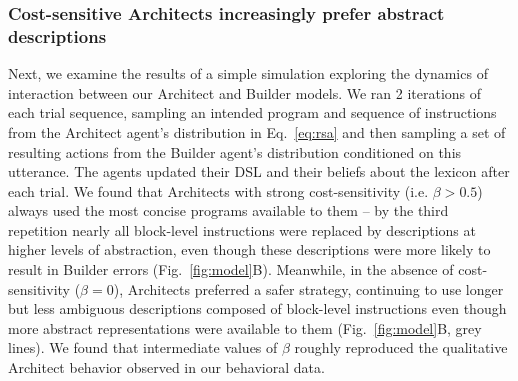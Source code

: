 \documentclass[10pt,letterpaper]{article}
\begin{document}
\vspace{1mm}
\subsubsection{Cost-sensitive Architects increasingly prefer abstract descriptions}
Next, we examine the results of a simple simulation exploring the dynamics of interaction between our Architect and Builder models.
We ran 2 iterations of each trial sequence, sampling an intended program and sequence of instructions from the Architect agent's distribution in Eq.~\ref{eq:rsa} and then sampling a set of resulting actions from the Builder agent's distribution conditioned on this utterance.
The agents updated their DSL and their beliefs about the lexicon after each trial. 
We found that Architects with strong cost-sensitivity (i.e. $\beta>0.5$) always used the most concise programs available to them -- by the third repetition nearly all block-level instructions were replaced by descriptions at higher levels of abstraction, even though these descriptions were more likely to result in Builder errors (Fig.~\ref{fig:model}B).
Meanwhile, in the absence of cost-sensitivity ($\beta=0$), Architects preferred a safer strategy, continuing to use longer but less ambiguous descriptions composed of block-level instructions even though more abstract representations were available to them (Fig.~\ref{fig:model}B, grey lines).
We found that intermediate values of $\beta$ roughly reproduced the qualitative Architect behavior observed in our behavioral data.


\end{document}
